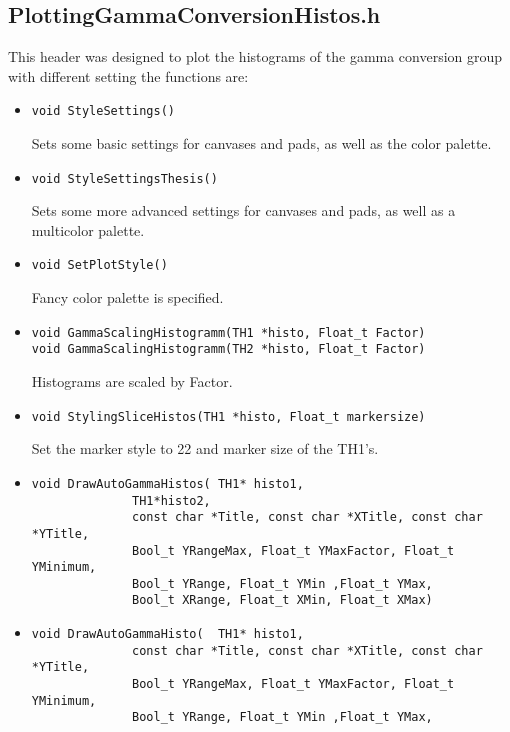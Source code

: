 	\subsection{PlottingGammaConversionHistos.h}
		This header was designed to plot the histograms of the gamma conversion group with different setting the functions are:
		\begin{itemize}
		\item 	\begin{lstlisting}
void StyleSettings()       	 
		       	\end{lstlisting}
		Sets some basic settings for canvases and pads, as well as the color palette.
		 \item 	\begin{lstlisting}
void StyleSettingsThesis()
		       	\end{lstlisting}
		Sets some more advanced settings for canvases and pads, as well as a multicolor palette.
\item 	\begin{lstlisting}
void SetPlotStyle() 		       	 
		       	\end{lstlisting}
		Fancy color palette is specified.
\item 	\begin{lstlisting}
void GammaScalingHistogramm(TH1 *histo, Float_t Factor) 
void GammaScalingHistogramm(TH2 *histo, Float_t Factor)
		       	\end{lstlisting}
		Histograms are scaled by Factor.
\item 	\begin{lstlisting}
void StylingSliceHistos(TH1 *histo, Float_t markersize)		       	 
		       	\end{lstlisting}
		Set the marker style to 22 and marker size of the TH1's.
\item 	\begin{lstlisting}
void DrawAutoGammaHistos( TH1* histo1, 
			  TH1*histo2, 
			  const char *Title, const char *XTitle, const char *YTitle, 
			  Bool_t YRangeMax, Float_t YMaxFactor, Float_t YMinimum, 
			  Bool_t YRange, Float_t YMin ,Float_t YMax, 
			  Bool_t XRange, Float_t XMin, Float_t XMax) 
		       	\end{lstlisting}
\item 	\begin{lstlisting}
void DrawAutoGammaHisto(  TH1* histo1, 
			  const char *Title, const char *XTitle, const char *YTitle,
			  Bool_t YRangeMax, Float_t YMaxFactor, Float_t YMinimum,
			  Bool_t YRange, Float_t YMin ,Float_t YMax,  

\end{lstlisting}
\end{itemize}
